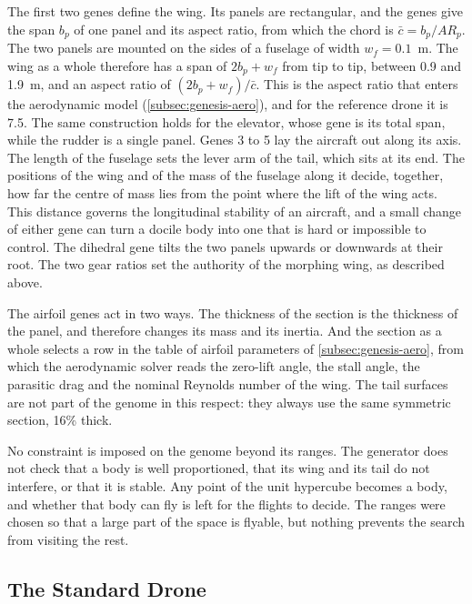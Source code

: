The first two genes define the wing. Its panels are rectangular, and the genes give the span $b_p$ of one panel and its aspect ratio, from which the chord is $\bar c = b_p / \mathit{AR}_p$. The two panels are mounted on the sides of a fuselage of width $w_f = 0.1$~m. The wing as a whole therefore has a span of $2 b_p + w_f$ from tip to tip, between 0.9 and 1.9~m, and an aspect ratio of $(2 b_p + w_f)/\bar c$. This is the aspect ratio that enters the aerodynamic model (\autoref{subsec:genesis-aero}), and for the reference drone it is 7.5. The same construction holds for the elevator, whose gene is its total span, while the rudder is a single panel. Genes 3 to 5 lay the aircraft out along its axis. The length of the fuselage sets the lever arm of the tail, which sits at its end. The positions of the wing and of the mass of the fuselage along it decide, together, how far the centre of mass lies from the point where the lift of the wing acts. This distance governs the longitudinal stability of an aircraft, and a small change of either gene can turn a docile body into one that is hard or impossible to control. The dihedral gene tilts the two panels upwards or downwards at their root. The two gear ratios set the authority of the morphing wing, as described above.

The airfoil genes act in two ways. The thickness of the section is the thickness of the panel, and therefore changes its mass and its inertia. And the section as a whole selects a row in the table of airfoil parameters of \autoref{subsec:genesis-aero}, from which the aerodynamic solver reads the zero-lift angle, the stall angle, the parasitic drag and the nominal Reynolds number of the wing. The tail surfaces are not part of the genome in this respect: they always use the same symmetric section, 16\% thick.

No constraint is imposed on the genome beyond its ranges. The generator does not check that a body is well proportioned, that its wing and its tail do not interfere, or that it is stable. Any point of the unit hypercube becomes a body, and whether that body can fly is left for the flights to decide. The ranges were chosen so that a large part of the space is flyable, but nothing prevents the search from visiting the rest.

\subsection{The Standard Drone}
\label{subsec:drone-standard}

